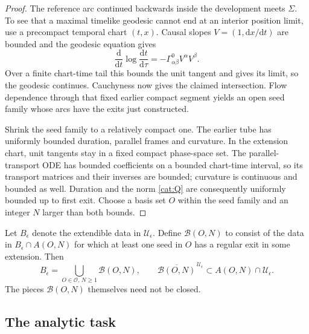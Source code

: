 \begin{proof}
The reference arc continued backwards inside the development meets
\(\Sigma\). To see that a maximal timelike geodesic cannot end at
an interior position limit, use a precompact temporal chart
\((t,x)\). Causal slopes \(V=(1,\mathrm dx/\mathrm dt)\) are
bounded and the geodesic equation gives
\[
 \frac{\mathrm d}{\mathrm dt}\log\frac{\mathrm dt}{\mathrm d\tau}
 =-\Gamma^0_{\alpha\beta}V^\alpha V^\beta.
\]
Over a finite chart-time tail this bounds the unit tangent and gives
its limit, so the geodesic continues. Cauchyness now gives the claimed
intersection. Flow dependence through that fixed earlier compact
segment yields an open seed family whose arcs have the exits just
constructed.

Shrink the seed family to a relatively compact one. The earlier tube
has uniformly bounded duration, parallel frames and curvature. In the
extension chart, unit tangents stay in a fixed compact phase-space
set. The parallel-transport ODE has bounded coefficients on a bounded
chart-time interval, so its transport matrices and their inverses are
bounded; curvature is continuous and bounded as well. Duration and the norm
\eqref{cat:Q} are consequently uniformly bounded up to first exit.
Choose a basis set \(O\) within the seed family and an integer \(N\)
larger than both bounds.
\end{proof}

Let \(B_\epsilon\) denote the extendible data in
\(\mathcal U_\epsilon\). Define \(\mathcal B(O,N)\) to consist of
the data in \(B_\epsilon\cap A(O,N)\) for which at least one seed
in \(O\) has a regular exit in some extension. Then
\begin{equation}\label{cat:cover}
 B_\epsilon=\bigcup_{O\in\mathscr O,\,N\geq1}\mathcal B(O,N),
 \qquad
 \overline{\mathcal B(O,N)}^{\,\mathcal U_\epsilon}
 \subset A(O,N)\cap\mathcal U_\epsilon.
\end{equation}
The pieces \(\mathcal B(O,N)\) themselves need not be closed.

\subsection{The analytic task}

